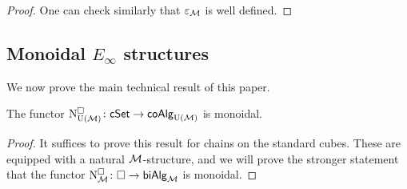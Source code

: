 \begin{proof}
	One can check similarly that $\varepsilon_{\mathcal{M}}$ is well defined.
\end{proof}

\subsection{Monoidal $E_\infty$ structures}

We now prove the main technical result of this paper.

\begin{theorem} \label{t:cubical e-infty chains are monoidal}
	The functor $\operatorname{N^{\square}_{{\operatorname{U}(\mathcal{M})}}} \colon \mathsf{cSet} \to \mathsf{coAlg}_{\operatorname{U}(\mathcal{M})}$ is monoidal.
\end{theorem}

\begin{proof}
	It suffices to prove this result for chains on the standard cubes.
	These are equipped with a natural $\mathcal{M}$-structure, and we will prove the stronger statement that the functor $\mathrm{N}^\square_{\mathcal{M}} \colon \square \to \mathsf{biAlg}_{\mathcal{M}}$ is monoidal.
	

\end{proof}
